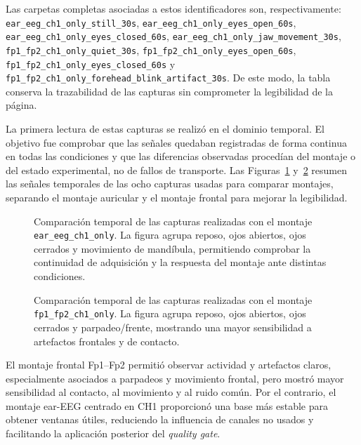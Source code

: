 Las carpetas completas asociadas a estos identificadores son, respectivamente: \texttt{ear\_eeg\_ch1\_only\_still\_30s}, \texttt{ear\_eeg\_ch1\_only\_eyes\_open\_60s}, \texttt{ear\_eeg\_ch1\_only\_eyes\_closed\_60s}, \texttt{ear\_eeg\_ch1\_only\_jaw\_movement\_30s}, \texttt{fp1\_fp2\_ch1\_only\_quiet\_30s}, \texttt{fp1\_fp2\_ch1\_only\_eyes\_open\_60s}, \texttt{fp1\_fp2\_ch1\_only\_eyes\_closed\_60s} y \texttt{fp1\_fp2\_ch1\_only\_forehead\_blink\_artifact\_30s}. De este modo, la tabla conserva la trazabilidad de las capturas sin comprometer la legibilidad de la página.

La primera lectura de estas capturas se realizó en el dominio temporal. El objetivo fue comprobar que las señales quedaban registradas de forma continua en todas las condiciones y que las diferencias observadas procedían del montaje o del estado experimental, no de fallos de transporte. Las Figuras~\ref{fig:validacion_montaje_temporales_ear} y~\ref{fig:validacion_montaje_temporales_fp1fp2} resumen las señales temporales de las ocho capturas usadas para comparar montajes, separando el montaje auricular y el montaje frontal para mejorar la legibilidad.

\begin{figure}[!htbp]
    \centering
    \caption{Comparación temporal de las capturas realizadas con el montaje \texttt{ear\_eeg\_ch1\_only}. La figura agrupa reposo, ojos abiertos, ojos cerrados y movimiento de mandíbula, permitiendo comprobar la continuidad de adquisición y la respuesta del montaje ante distintas condiciones.}
    \label{fig:validacion_montaje_temporales_ear}
\end{figure}

\begin{figure}[!htbp]
    \centering
    \caption{Comparación temporal de las capturas realizadas con el montaje \texttt{fp1\_fp2\_ch1\_only}. La figura agrupa reposo, ojos abiertos, ojos cerrados y parpadeo/frente, mostrando una mayor sensibilidad a artefactos frontales y de contacto.}
    \label{fig:validacion_montaje_temporales_fp1fp2}
\end{figure}

El montaje frontal Fp1--Fp2 permitió observar actividad y artefactos claros, especialmente asociados a parpadeos y movimiento frontal, pero mostró mayor sensibilidad al contacto, al movimiento y al ruido común. Por el contrario, el montaje ear-EEG centrado en CH1 proporcionó una base más estable para obtener ventanas útiles, reduciendo la influencia de canales no usados y facilitando la aplicación posterior del \textit{quality gate}.

